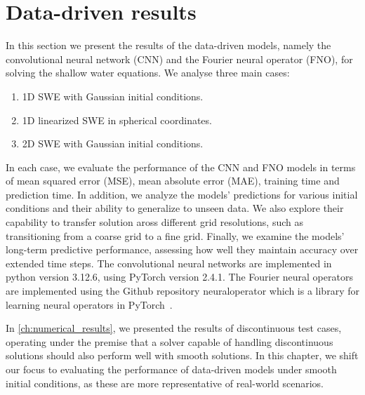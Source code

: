 \chapter{Data-driven results}\label{ch:data-driven-results}
In this section we present the results of the data-driven models, namely the convolutional neural network (CNN) and the Fourier neural operator (FNO), for solving the shallow water equations.
We analyse three main cases:
\begin{enumerate}
    \item 1D SWE with Gaussian initial conditions. 
    \item 1D linearized SWE in spherical coordinates.
    \item 2D SWE with Gaussian initial conditions.
\end{enumerate}
In each case, we evaluate the performance of the CNN and FNO models in terms of mean squared error (MSE), mean absolute error (MAE), training time and prediction time.
In addition, we analyze the models' predictions for various initial conditions and their ability to generalize to unseen data.
We also explore their capability to transfer solution aross different grid resolutions, such as transitioning from a coarse grid to a fine grid.
Finally, we examine the models' long-term predictive performance, assessing how well they maintain accuracy over extended time steps.
The convolutional neural networks are implemented in python version 3.12.6, using PyTorch version 2.4.1.
The Fourier neural operators are implemented using the Github repository neuraloperator which is a library for learning neural operators in PyTorch~\cite{neuraloperator}.

In \autoref{ch:numerical_results}, we presented the results of discontinuous test cases, operating under the premise that a solver capable of handling discontinuous solutions should also perform well with smooth solutions.
In this chapter, we shift our focus to evaluating the performance of data-driven models under smooth initial conditions, as these are more representative of real-world scenarios.

